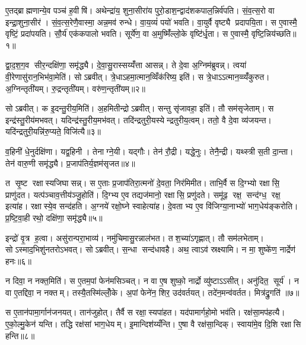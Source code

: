 
\clearpage
{}
\setcounter{anuvakam}{0}
ए॒तद्ब्राह्मणान्ये॒व पञ्च॑ ह॒वीषि॑। अथेन्द्रा॑य॒ शुना॒सीरा॑य पुरो॒डाश॒न्द्वाद॑शकपाल॒न्निर्व॑पति। सं॒व॒त्स॒रो वा इन्द्रा॒शुना॒सीर॑। सं॒व॒त्स॒रेणै॒वास्मा॒ अन्न॒मव॑ रुन्धे। वा॒य॒व्यं॑ पयो॑ भवति। वा॒युर्वै वृष्ट्यै प्रदापयि॒ता। स ए॒वास्मै॒ वृष्टिं॒ प्रदा॑पयति। सौ॒र्य॑ एक॑कपालो भवति। सूर्ये॑ण॒ वा अ॒मुष्मिँ॑ल्लो॒के वृष्टि॑र्धृ॒ता। स ए॒वास्मै॒ वृष्टि॒न्निय॑च्छति॥१॥

द्वा॒द॒श॒ग॒व सीर॒न्दक्षि॑णा॒ समृ॑द्ध्यै। दे॒वा॒सु॒रास्सय्यँ॑त्ता आसन्न्। ते दे॒वा अ॒ग्निम॑ब्रुवन्न्। त्वया॑ वी॒रेणासु॑रान॒भिभ॑वा॒मेति॑। सोऽब्रवीत्। त्रे॒धाऽहमा॒त्मान॒व्विँक॑रिष्य॒ इति॑। स त्रे॒धाऽऽत्मान॒व्व्यँ॑कुरुत। अ॒ग्निन्तृती॑यम्। रु॒द्रन्तृती॑यम्। वरु॑ण॒न्तृती॑यम्॥२॥

सोऽब्रवीत्। क इ॒दन्तु॒रीय॒मिति॑। अ॒हमितीन्द्रोऽब्रवीत्। सन्तु सृ॑जावहा॒ इति॑। तौ सम॑सृजेताम्। स इन्द्र॑स्तु॒रीय॑मभवत्। यदिन्द्र॑स्तु॒रीय॒मभ॑वत्। तदि॑न्द्रतुरी॒यस्येन्द्रतुरीय॒त्वम्। ततो॒ वै दे॒वा व्य॑जयन्त। यदि॑न्द्रतुरी॒यन्नि॑रु॒प्यते॒ विजि॑त्यै॥३॥

व॒हिनी॑ धे॒नुर्दक्षि॑णा। यद्व॒हिनी। तेनाग्ने॒यी। यद्गौः। तेन॑ रौ॒द्री। यद्धे॒नुः। तेनै॒न्द्री। यथ्स्त्री स॒ती दा॒न्ता। तेन॑ वारु॒णी समृ॑द्ध्यै। प्र॒जाप॑तिर्य॒ज्ञम॑सृजत॥४॥

त सृ॒ष्ट रक्षास्यजिघासन्न्। स ए॒ताः प्र॒जाप॑तिरा॒त्मनो॑ दे॒वता॒ निर॑मिमीत। ताभि॒र्वै स दि॒ग्भ्यो रक्षासि॒ प्राणु॑दत। यत्प॑ञ्चाव॒त्तीय॑ञ्जु॒होति॑। दि॒ग्भ्य ए॒व तद्यज॑मानो॒ रक्षासि॒ प्रणु॑दते। समू॑ढ॒ रक्ष॒ सन्द॑ग्ध॒ रक्ष॒ इत्या॑ह। रक्षास्ये॒व सन्द॑हति। अ॒ग्नये॑ रक्षो॒घ्ने स्वाहेत्या॑ह। दे॒वताभ्य ए॒व वि॑जिग्या॒नाभ्यो॑ भाग॒धेय॑ङ्करोति। प्र॒ष्टि॒वा॒ही रथो॒ दक्षि॑णा॒ समृ॑द्ध्यै॥५॥

इन्द्रो॑ वृ॒त्र ह॒त्वा। असु॑रान्परा॒भाव्य॑। नमु॑चिमासु॒रन्नाल॑भत। तश॒च्या॑ऽगृह्णात्। तौ सम॑लभेताम्। सोऽस्माद॒भिशु॑नतरोऽभवत्। सोऽब्रवीत्। स॒न्धा सन्द॑धावहै। अथ॒ त्वाऽव॑ स्रक्ष्यामि। न मा॒ शुष्के॑ण॒ नार्द्रेण॑ हनः॥६॥

न दिवा॒ न नक्त॒मिति॑। स ए॒तम॒पां फेन॑मसिञ्चत्। न वा ए॒ष शुष्को॒ नार्द्रो व्यु॑ष्टाऽऽसीत्। अनु॑दित॒ सूर्य॑। न वा ए॒तद्दिवा॒ न नक्तम्। तस्यै॒तस्मि॑ल्लोँ॒के। अ॒पां फेने॑न॒ शिर॒ उद॑वर्तयत्। तदे॑न॒मन्व॑वर्तत। मित्र॑द्रु॒गति॑ ॥७॥

स ए॒तान॑पामा॒र्गान॑जनयत्। तान॑जुहोत्। तैर्वै स रक्षा॒स्यपा॑हत। यद॑पामार्गहो॒मो भव॑ति। रक्ष॑सा॒मप॑हत्यै। ए॒को॒ल्मु॒केन॑ यन्ति। तद्धि रक्ष॑सां भाग॒धेयम्। इ॒मान्दिश॑य्यँन्ति। ए॒षा वै रक्ष॑सा॒न्दिक्। स्वाया॑मे॒व दि॒शि रक्षासि हन्ति॥८॥

